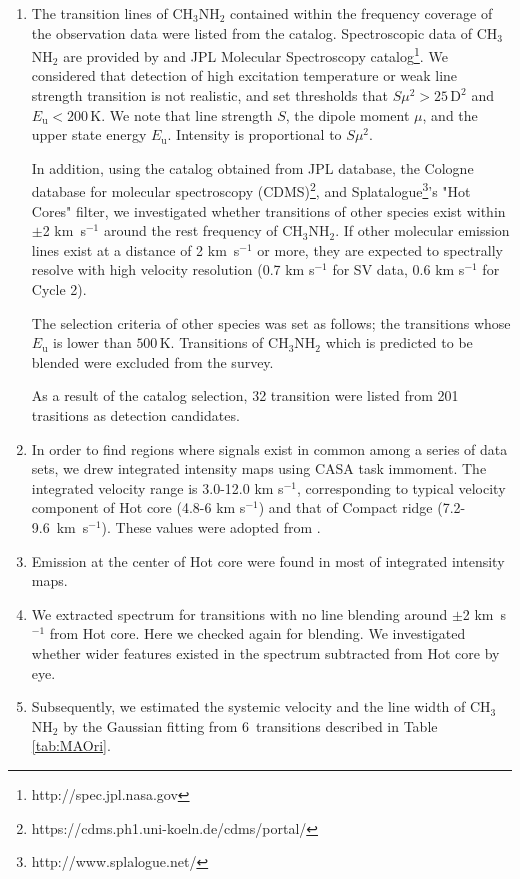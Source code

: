 \begin{enumerate}
\item The transition lines of CH$_3$NH$_2$ contained within the frequency coverage of the observation data were listed from the catalog. Spectroscopic data of CH$_3$NH$_2$ are provided by \citet{Motiyenko+2014} and JPL Molecular Spectroscopy catalog\footnote{http://spec.jpl.nasa.gov}.
We considered that detection of high excitation temperature or weak line strength transition 
is not realistic, and set thresholds that $S\mu^2 > 25\,\mathrm{D^2}$ and $E_{\mathrm{u}} < 200 \,\mathrm{K}$. We note that line strength $S$, the dipole moment $\mu$, and the upper state energy 
$E_{\mathrm{u}}$. Intensity is proportional to $S\mu^2$.

In addition, using the catalog obtained from JPL database, the Cologne database for molecular 
spectroscopy (CDMS)\footnote{https://cdms.ph1.uni-koeln.de/cdms/portal/}, 
and Splatalogue\footnote{http://www.splalogue.net/}'s "Hot Cores" filter, 
we investigated whether transitions of other species exist within $\pm$2 km~s$^{-1}$  
around the rest frequency of CH$_3$NH$_2$. 
If other molecular emission lines exist at a distance of 2 km~s$^{-1}$ or more, they are expected to spectrally resolve with high velocity resolution (0.7 km s$^{-1}$ for SV data, 0.6 km s$^{-1}$ for Cycle 2).


The selection criteria of other species was set as follows; 
the transitions whose $E_{\mathrm{u}}$ is lower than $500\, \mathrm{K}$.
Transitions of CH$_3$NH$_2$ which is predicted to be blended were excluded from the survey.

As a result of the catalog selection, 32 transition were listed from 201 trasitions as detection candidates.

\item In order to find regions where signals exist in common among a series of data sets, 
we drew integrated intensity maps 
using CASA task {\sc immoment}. The integrated velocity range is 3.0-12.0 km s$^{-1}$, corresponding to
typical velocity component of Hot core (4.8-6 km s$^{-1}$) and that of Compact ridge 
(7.2-9.6~km~s$^{-1}$). These values were adopted from \citet{Feng+2015}.

\item Emission at the center of Hot core were found in most of integrated intensity maps. 

\item We extracted spectrum for transitions with no line blending around $\pm$2 km~s$^{-1}$ from Hot core. Here we checked again for blending. We investigated whether wider features existed 
in the spectrum subtracted from Hot core by eye.

\item Subsequently, we estimated the systemic velocity and the line width of CH$_3$NH$_2$ 
by the Gaussian fitting from 6~transitions described in Table \ref{tab:MAOri}.
\end{enumerate}
